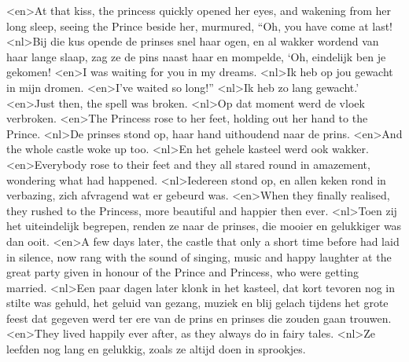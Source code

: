 <en>At that kiss, the princess quickly opened her eyes, and wakening from her long sleep, seeing the Prince beside her, murmured, “Oh, you have come at last!
<nl>Bij die kus opende de prinses snel haar ogen, en al wakker wordend van haar lange slaap, zag ze de pins naast haar en mompelde, `Oh, eindelijk ben je gekomen!
<en>I was waiting for you in my dreams.
<nl>Ik heb op jou gewacht in mijn dromen.
<en>I’ve waited so long!”
<nl>Ik heb zo lang gewacht.'
<en>Just then, the spell was broken.
<nl>Op dat moment werd de vloek verbroken.
<en>The Princess rose to her feet, holding out her hand to the Prince.
<nl>De prinses stond op,  haar hand uithoudend naar de prins.
<en>And the whole castle woke up too.
<nl>En het gehele kasteel werd ook wakker.
<en>Everybody rose to their feet and they all stared round in amazement, wondering what had happened.
<nl>Iedereen stond op, en allen keken rond in verbazing, zich afvragend wat er gebeurd was. 
<en>When they finally realised, they rushed to the Princess, more beautiful and happier then ever.
<nl>Toen zij het uiteindelijk begrepen, renden ze naar de prinses, die mooier  en gelukkiger was dan ooit.
<en>A few days later, the castle that only a short time before had laid in silence, now rang with the sound of singing, music and happy laughter at the great party given in honour of the Prince and Princess, who were getting married.
<nl>Een paar dagen later klonk in het kasteel, dat kort tevoren nog in stilte was gehuld, het geluid van gezang, muziek  en blij gelach tijdens het grote feest dat gegeven werd ter ere van de prins en prinses die zouden gaan trouwen.
<en>They lived happily ever after, as they always do in fairy tales.
<nl>Ze leefden nog lang en gelukkig, zoals ze altijd doen in sprookjes.
